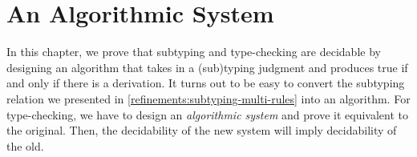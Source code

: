 
\chapter{An Algorithmic System}

In this chapter, we prove that subtyping and type-checking are decidable by designing an algorithm that takes in a (sub)typing judgment and produces true if and only if there is a derivation. It turns out to be easy to convert the subtyping relation we presented in \cref{refinements:subtyping-multi-rules} into an algorithm. For type-checking, we have to design an \emph{algorithmic system} and prove it equivalent to the original. Then, the decidability of the new system will imply decidability of the old.

